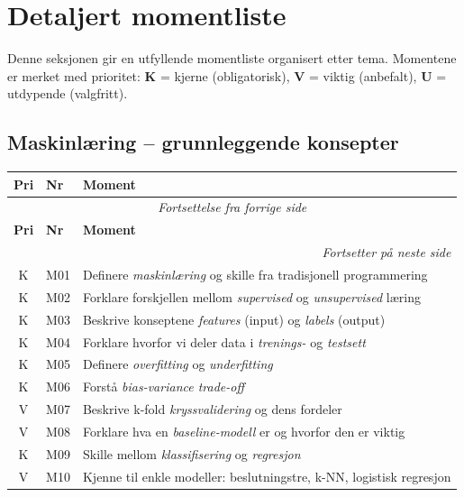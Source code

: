 \documentclass[11pt,a4paper]{article}
\begin{document}
\section{Detaljert momentliste}

Denne seksjonen gir en utfyllende momentliste organisert etter tema. Momentene er merket med prioritet: \textbf{K} = kjerne (obligatorisk), \textbf{V} = viktig (anbefalt), \textbf{U} = utdypende (valgfritt).

\subsection{Maskinlæring -- grunnleggende konsepter}

\begin{longtable}{@{}clp{9cm}@{}}
\toprule
\textbf{Pri} & \textbf{Nr} & \textbf{Moment} \\
\midrule
\endfirsthead
\multicolumn{3}{c}{\textit{Fortsettelse fra forrige side}} \\
\toprule
\textbf{Pri} & \textbf{Nr} & \textbf{Moment} \\
\midrule
\endhead
\midrule
\multicolumn{3}{r}{\textit{Fortsetter på neste side}} \\
\endfoot
\bottomrule
\endlastfoot
K & M01 & Definere \emph{maskinlæring} og skille fra tradisjonell programmering \\
K & M02 & Forklare forskjellen mellom \emph{supervised} og \emph{unsupervised} læring \\
K & M03 & Beskrive konseptene \emph{features} (input) og \emph{labels} (output) \\
K & M04 & Forklare hvorfor vi deler data i \emph{trenings-} og \emph{testsett} \\
K & M05 & Definere \emph{overfitting} og \emph{underfitting} \\
K & M06 & Forstå \emph{bias-variance trade-off} \\
V & M07 & Beskrive k-fold \emph{kryssvalidering} og dens fordeler \\
V & M08 & Forklare hva en \emph{baseline-modell} er og hvorfor den er viktig \\
K & M09 & Skille mellom \emph{klassifisering} og \emph{regresjon} \\
V & M10 & Kjenne til enkle modeller: beslutningstre, k-NN, logistisk regresjon \\
\end{longtable}
\end{document}
